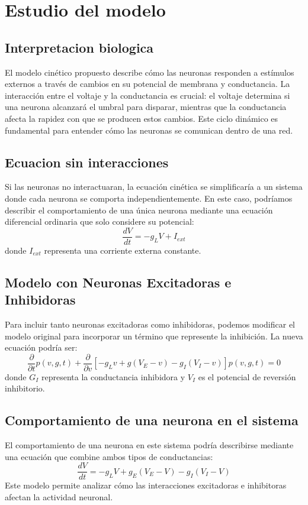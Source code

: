 \documentclass[10pt,twocolumn]{article}
\begin{document}
\section{Estudio del modelo}
\subsection{Interpretacion biologica}
El modelo cinético propuesto describe cómo las neuronas responden a estímulos externos a través de cambios en su potencial de membrana y conductancia. La interacción entre el voltaje y la conductancia es crucial: el voltaje determina si una neurona alcanzará el umbral para disparar, mientras que la conductancia afecta la rapidez con que se producen estos cambios. Este ciclo dinámico es fundamental para entender cómo las neuronas se comunican dentro de una red.

\subsection{Ecuacion sin interacciones}
Si las neuronas no interactuaran, la ecuación cinética se simplificaría a un sistema donde cada neurona se comporta independientemente. En este caso, podríamos describir el comportamiento de una única neurona mediante una ecuación diferencial ordinaria que solo considere su potencial:
\begin{equation}
	\frac{dV}{dt} = -g_L V + I_{ext}
\end{equation}
donde $I_{ext}$ representa una corriente externa constante.

\subsection{Modelo con Neuronas Excitadoras e Inhibidoras}
Para incluir tanto neuronas excitadoras como inhibidoras, podemos modificar el modelo original para incorporar un término que represente la inhibición. La nueva ecuación podría ser:
\begin{equation}
	\frac{\partial}{\partial t} p(v, g, t) + \frac{\partial}{\partial v} \left[ -g_L v + g(V_E - v) - g_I (V_I - v) \right] p(v, g, t) = 0
\end{equation}
donde $G_{I}$ representa la conductancia inhibidora y $V_{I}$ es el potencial de reversión inhibitorio.

\subsection{Comportamiento de una neurona en el sistema}
El comportamiento de una neurona en este sistema podría describirse mediante una ecuación que combine ambos tipos de conductancias:
\begin{equation}
	\frac{dV}{dt} = -g_L V + g_E (V_E - V) - g_I (V_I - V)
\end{equation}
Este modelo permite analizar cómo las interacciones excitadoras e inhibitoras afectan la actividad neuronal.
\end{document}
